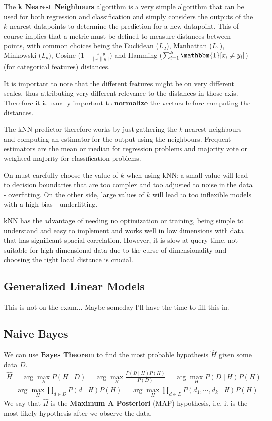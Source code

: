 \documentclass{article}
\newcommand{\ind}{\mathbbm{1}}
\begin{document}
The \textbf{k Nearest Neighbours} algorithm is a very simple algorithm that can be used for both regression and classification and simply considers the outputs of the $k$ nearest datapoints to determine the prediction for a new datapoint.
This of course implies that a metric must be defined to measure distances between points, with common choices being the Euclidean ($L_2$), Manhattan ($L_1$), Minkowski ($L_p$), Cosine ($1 - \frac{x \cdot y}{||x|| ||y||}$) and Hamming ($\sum_{i=1}^k \ind[ x_i \neq y_i ]$) (for categorical features) distances.

It is important to note that the different features might be on very different scales, thus attributing very different relevance to the distances in those axis.
Therefore it is usually important to \textbf{normalize} the vectors before computing the distances.

The kNN predictor therefore works by just gathering the $k$ nearest neighbours and computing an estimator for the output using the neighbours.
Frequent estimators are the mean or median for regression problems and majority vote or weighted majority for classification problems.

On must carefully choose the value of $k$ when using kNN: a small value will lead to decision boundaries that are too complex and too adjusted to noise in the data - overfitting.
On the other side, large values of $k$ will lead to too inflexible models with a high bias - underfitting.

kNN has the advantage of needing no optimization or training, being simple to understand and easy to implement and works well in low dimensions with data that has significant spacial correlation.
However, it is slow at query time, not suitable for high-dimensional data due to the curse of dimensionality and choosing the right local distance is crucial.

\subsection{Generalized Linear Models}

This is not on the exam... Maybe someday I'll have the time to fill this in.

\subsection{Naive Bayes}

We can use \textbf{Bayes Theorem} to find the most probable hypothesis $\hat{H}$ given some data $D$.
\begin{gather*}
\hat{H} = \arg \max_{H} P(H \mid D) = \arg \max_{H} \frac{P(D \mid H)P(H)}{P(D)} = \arg \max_{H} P(D \mid H)P(H) = \\
= \arg \max_{H} \prod_{d \in D} P(d \mid H)P(H) = \arg \max_{H} \prod_{d \in D} P(d_1, \cdots, d_k \mid H)P(H)
\end{gather*}
We say that $\hat{H}$ is the \textbf{Maximum A Posteriori} (MAP) hypothesis, i.e, it is the most likely hypothesis after we observe the data.
\end{document}

